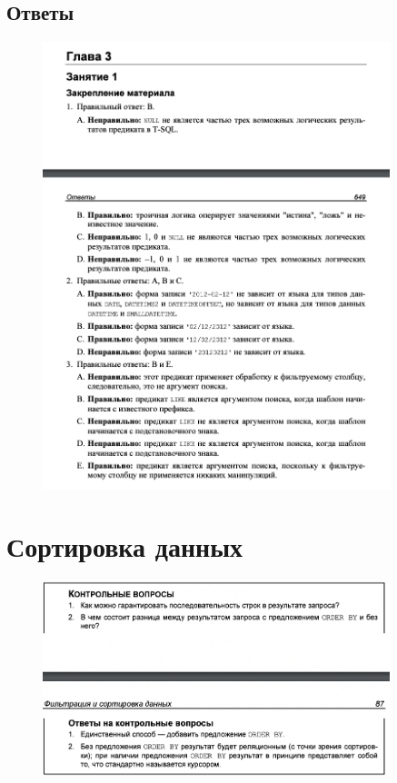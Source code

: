 \subsection*{Ответы}

\begin{figure}[h!]
	\begin{center}
		\includegraphics[width=0.9\textwidth]{img/ans5.png}
	\end{center}
	\captionsetup{justification=centering}
\end{figure}
\clearpage




\section{Сортировка данных}

\begin{figure}[h!]
	\begin{center}
		\includegraphics[width=0.9\textwidth]{img/control9.png}
	\end{center}
	\captionsetup{justification=centering}
\end{figure}




